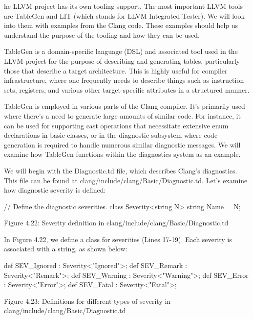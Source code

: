 he LLVM project has its own tooling support. The most important LLVM tools are TableGen and LIT (which stands for LLVM Integrated Tester). We will look into them with examples from the Clang code. These examples should help us understand the purpose of the tooling and how they can be used.


TableGen is a domain-specific language (DSL) and associated tool used in the LLVM project for the purpose of describing and generating tables, particularly those that describe a target architecture. This is highly useful for compiler infrastructure, where one frequently needs to describe things such as instruction sets, registers, and various other target-specific attributes in a structured manner.

TableGen is employed in various parts of the Clang compiler. It’s primarily used where there’s a need to generate large amounts of similar code. For instance, it can be used for supporting cast operations that necessitate extensive enum declarations in basic classes, or in the diagnostic subsystem where code generation is required to handle numerous similar diagnostic messages. We will examine how TableGen functions within the diagnostics system as an example.

We will begin with the Diagnostic.td file, which describes Clang’s diagnostics. This file can be found at clang/include/clang/Basic/Diagnostic.td. Let’s examine how diagnostic severity is defined:

\begin{shell}
// Define the diagnostic severities.
class Severity<string N> {
  string Name = N;
}
\end{shell}

\begin{center}
Figure 4.22: Severity definition in clang/include/clang/Basic/Diagnostic.td
\end{center}

In Figure 4.22, we define a class for severities (Lines 17-19). Each severity is associated with a string, as shown below:

\begin{shell}
def SEV_Ignored : Severity<"Ignored">;
def SEV_Remark  : Severity<"Remark">;
def SEV_Warning : Severity<"Warning">;
def SEV_Error   : Severity<"Error">;
def SEV_Fatal   : Severity<"Fatal">;
\end{shell}

\begin{center}
Figure 4.23: Definitions for different types of severity in clang/include/clang/Basic/Diagnostic.td
\end{center}

